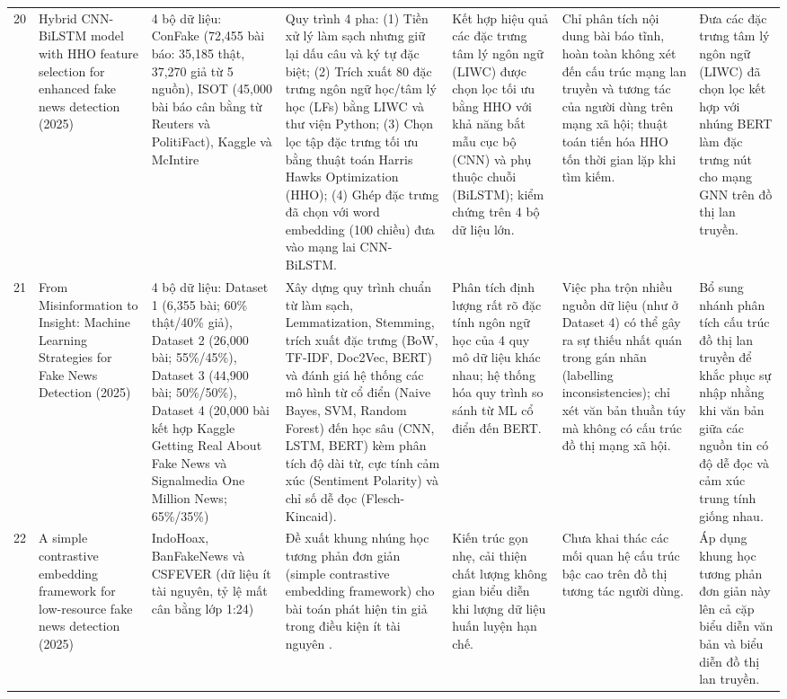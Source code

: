 \documentclass[11pt,a4paper]{extreport}
\begin{document}
\begin{landscape}
\begin{longtable}{@{}C{0.6cm}p{3.6cm}p{2.7cm}p{4.8cm}p{3.6cm}p{3.6cm}p{3.6cm}@{}}
20 & Hybrid CNN-BiLSTM model with HHO feature selection for enhanced fake news detection (2025) \cite{noauthor_hybrid_2025} & 4 bộ dữ liệu: ConFake (72,455 bài báo: 35,185 thật, 37,270 giả từ 5 nguồn), ISOT (45,000 bài báo cân bằng từ Reuters và PolitiFact), Kaggle và McIntire & Quy trình 4 pha: (1) Tiền xử lý làm sạch nhưng giữ lại dấu câu và ký tự đặc biệt; (2) Trích xuất 80 đặc trưng ngôn ngữ học/tâm lý học (LFs) bằng LIWC và thư viện Python; (3) Chọn lọc tập đặc trưng tối ưu bằng thuật toán Harris Hawks Optimization (HHO); (4) Ghép đặc trưng đã chọn với word embedding (100 chiều) đưa vào mạng lai CNN-BiLSTM. & Kết hợp hiệu quả các đặc trưng tâm lý ngôn ngữ (LIWC) được chọn lọc tối ưu bằng HHO với khả năng bắt mẫu cục bộ (CNN) và phụ thuộc chuỗi (BiLSTM); kiểm chứng trên 4 bộ dữ liệu lớn. & Chỉ phân tích nội dung bài báo tĩnh, hoàn toàn không xét đến cấu trúc mạng lan truyền và tương tác của người dùng trên mạng xã hội; thuật toán tiến hóa HHO tốn thời gian lặp khi tìm kiếm. & Đưa các đặc trưng tâm lý ngôn ngữ (LIWC) đã chọn lọc kết hợp với nhúng BERT làm đặc trưng nút cho mạng GNN trên đồ thị lan truyền. \\ 

21 & From Misinformation to Insight: Machine Learning Strategies for Fake News Detection (2025) \cite{noauthor_misinformation_2025} & 4 bộ dữ liệu: Dataset 1 (6,355 bài; 60\% thật/40\% giả), Dataset 2 (26,000 bài; 55\%/45\%), Dataset 3 (44,900 bài; 50\%/50\%), Dataset 4 (20,000 bài kết hợp Kaggle Getting Real About Fake News và Signalmedia One Million News; 65\%/35\%) & Xây dựng quy trình chuẩn từ làm sạch, Lemmatization, Stemming, trích xuất đặc trưng (BoW, TF-IDF, Doc2Vec, BERT) và đánh giá hệ thống các mô hình từ cổ điển (Naive Bayes, SVM, Random Forest) đến học sâu (CNN, LSTM, BERT) kèm phân tích độ dài từ, cực tính cảm xúc (Sentiment Polarity) và chỉ số dễ đọc (Flesch-Kincaid). & Phân tích định lượng rất rõ đặc tính ngôn ngữ học của 4 quy mô dữ liệu khác nhau; hệ thống hóa quy trình so sánh từ ML cổ điển đến BERT. & Việc pha trộn nhiều nguồn dữ liệu (như ở Dataset 4) có thể gây ra sự thiếu nhất quán trong gán nhãn (labelling inconsistencies); chỉ xét văn bản thuần túy mà không có cấu trúc đồ thị mạng xã hội. & Bổ sung nhánh phân tích cấu trúc đồ thị lan truyền để khắc phục sự nhập nhằng khi văn bản giữa các nguồn tin có độ dễ đọc và cảm xúc trung tính giống nhau. \\ 

22 & A simple contrastive embedding framework for low-resource fake news detection (2025) \cite{noauthor_simple_2025} & IndoHoax, BanFakeNews và CSFEVER (dữ liệu ít tài nguyên, tỷ lệ mất cân bằng lớp 1:24) & Đề xuất khung nhúng học tương phản đơn giản (simple contrastive embedding framework) cho bài toán phát hiện tin giả trong điều kiện ít tài nguyên \cite{noauthor_simple_2025}. & Kiến trúc gọn nhẹ, cải thiện chất lượng không gian biểu diễn khi lượng dữ liệu huấn luyện hạn chế. & Chưa khai thác các mối quan hệ cấu trúc bậc cao trên đồ thị tương tác người dùng. & Áp dụng khung học tương phản đơn giản này lên cả cặp biểu diễn văn bản và biểu diễn đồ thị lan truyền. \\ 


\end{longtable}
\end{landscape}
\end{document}
